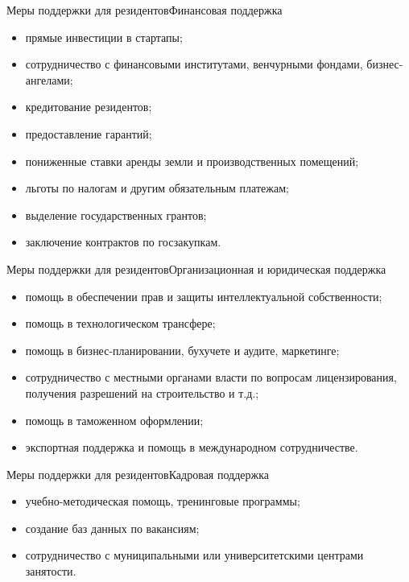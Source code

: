 \documentclass[_Venture_p3.tex]{subfiles}
\begin{document}
 
\begin{frame}[allowframebreaks]{Меры поддержки для резидентов}{Финансовая поддержка}
\begin{itemize}
	\item прямые инвестиции в стартапы;
	\item сотрудничество с финансовыми институтами, венчурными фондами, бизнес-ангелами;
	\item кредитование резидентов;
	
	\pagebreak
	\item предоставление гарантий;
	\item пониженные ставки аренды земли и производственных помещений;
	\item льготы по налогам и другим обязательным платежам;
	
	\pagebreak
	\item выделение государственных грантов;
	\item заключение контрактов по госзакупкам.
\end{itemize}
\end{frame}

 


\begin{frame}[allowframebreaks]{Меры поддержки для резидентов}{Организационная и юридическая поддержка}
\begin{itemize}
	\item помощь в обеспечении прав и защиты интеллектуальной собственности;
	\item помощь в технологическом трансфере;
	
	\pagebreak
	\item помощь в бизнес-планировании, бухучете и аудите, маркетинге;
	\item сотрудничество с местными органами власти по вопросам лицензирования, получения разрешений на строительство и т.д.;
	
	\pagebreak
	\item помощь в таможенном оформлении;
	\item экспортная поддержка и помощь в международном сотрудничестве.
\end{itemize}
\end{frame}

\begin{frame}[allowframebreaks]{Меры поддержки для резидентов}{Кадровая поддержка}
\begin{itemize}
	\item учебно-методическая помощь, тренинговые программы;
	\item создание баз данных по вакансиям;
	\item сотрудничество с муниципальными или университетскими центрами занятости.
\end{itemize}
\end{frame}
\end{document}
